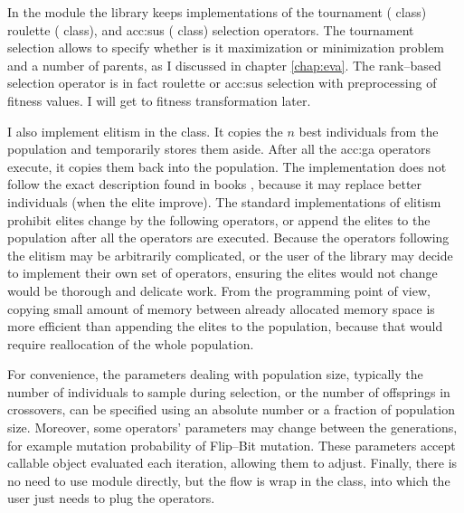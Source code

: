 In the  module the library keeps implementations of the 
tournament ( class)
roulette ( class), 
and \acrlong{acc:sus} ( class)
selection operators. The tournament selection allows to specify whether is it maximization or minimization problem and a number of parents, as I discussed in chapter \ref{chap:eva}. The rank--based selection operator is in fact roulette or \acrshort{acc:sus} selection with preprocessing of fitness values. I will get to fitness transformation later.

I also implement elitism in the  class. It copies the $n$ best individuals from the population and temporarily stores them aside. After all the \acrshort{acc:ga} operators execute, it copies them back into the population. The implementation does not follow the exact description found in books \citep{IntroductionToEA}, because it may replace better individuals (when the elite improve). The standard implementations of elitism prohibit elites change by the following operators, or append the elites to the population after all the operators are executed. 
Because the operators following the elitism may be arbitrarily complicated, or the user of the library may decide to implement their own set of operators, ensuring the elites would not change would be thorough and delicate work. %
From the \gpu programming point of view, copying small amount of memory between already allocated memory space is more efficient than appending the elites to the population, because that would require reallocation of the whole population.

For convenience, the parameters dealing with population size, typically the number of individuals to sample during selection, or the number of offsprings in crossovers, can be specified using an absolute number or a fraction of population size. Moreover, some operators' parameters may change between the generations, for example mutation probability of Flip--Bit mutation. These parameters accept callable object evaluated each iteration, allowing them to adjust. Finally, there is no need to use  module directly, but the flow is wrap in the  class, into which the user just needs to plug the operators.

